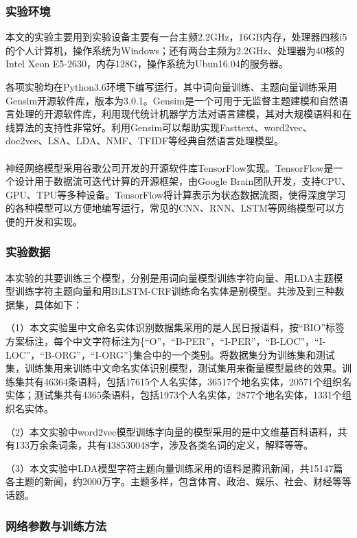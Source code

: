 \documentclass[winfonts,master,oneside,nobackinfo]{njuthesis}
\newcommand{\upcite}[1]{\textsuperscript{\textsuperscript{\cite{#1}}}}
\begin{document}
\subsubsection{实验环境}

本文的实验主要用到实验设备主要有一台主频2.2GHz，16GB内存，处理器四核i5的个人计算机，操作系统为Windows；还有两台主频为2.2GHz、处理器为40核的Intel Xeon E5-2630，内存128G，操作系统为Ubun16.04的服务器。

各项实验均在Python3.6环境下编写运行，其中词向量训练、主题向量训练采用Gensim开源软件库，版本为3.0.1。Gensim是一个可用于无监督主题建模和自然语言处理的开源软件库，利用现代统计机器学方法对语言建模，其对大规模语料和在线算法的支持性非常好。利用Gensim可以帮助实现Fasttext、word2vec、doc2vec、LSA、LDA、NMF、TFIDF等经典自然语言处理模型。

神经网络模型采用谷歌公司开发的开源软件库TensorFlow\upcite{TensorFlow}实现。TensorFlow是一个设计用于数据流可迭代计算的开源框架，由Google Brain团队开发，支持CPU、GPU、TPU等多种设备。TensorFlow将计算表示为状态数据流图，使得深度学习的各种模型可以方便地编写运行，常见的CNN、RNN、LSTM等网络模型可以方便的开发和实现。

\subsubsection{实验数据}

本实验的共要训练三个模型，分别是用词向量模型训练字符向量、用LDA主题模型训练字符主题向量和用BiLSTM-CRF训练命名实体是别模型。共涉及到三种数据集，具体如下：

（1）本文实验里中文命名实体识别数据集采用的是人民日报语料，按“BIO”标签方案标注，每个中文字符标注为\{“O”，“B-PER”，“I-PER”，“B-LOC”，“I-LOC”，“B-ORG”，“I-ORG”\}集合中的一个类别。将数据集分为训练集和测试集，训练集用来训练中文命名实体识别模型，测试集用来衡量模型最终的效果。训练集共有46364条语料，包括17615个人名实体，36517个地名实体，20571个组织名实体；测试集共有4365条语料，包括1973个人名实体，2877个地名实体，1331个组织名实体。

（2）本文实验中word2vec模型训练字向量的模型采用的是中文维基百科语料，共有133万余条词条，共有438530048字，涉及各类名词的定义，解释等等。

（3）本文实验中LDA模型字符主题向量训练采用的语料是腾讯新闻，共15147篇各主题的新闻，约2000万字。主题多样，包含体育、政治、娱乐、社会、财经等等话题。

\subsubsection{网络参数与训练方法}
\end{document}
